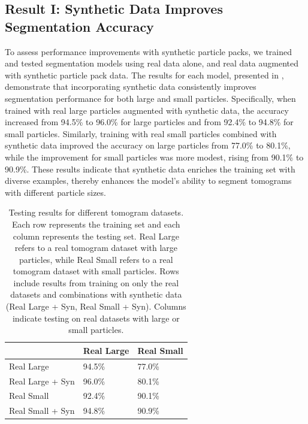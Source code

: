 \documentclass[preprint,12pt]{elsarticle}
\begin{document}
\subsection{Result I: Synthetic Data Improves Segmentation Accuracy}
To assess performance improvements with synthetic particle packs, we trained and tested segmentation models using real data alone, and real data augmented with synthetic particle pack data. 
The results for each model, presented in , demonstrate that incorporating synthetic data consistently improves segmentation performance for both large and small particles.
Specifically, when trained with real large particles augmented with synthetic data, the accuracy increased from 94.5\% to 96.0\% for large particles and from 92.4\% to 94.8\% for small particles. 
Similarly, training with real small particles combined with synthetic data improved the accuracy on large particles from 77.0\% to 80.1\%, while the improvement for small particles was more modest, rising from 90.1\% to 90.9\%. 
These results indicate that synthetic data enriches the training set with diverse examples, thereby enhances the model's ability to segment tomograms with different particle sizes. 
\begin{table}[]
    \center
    \begin{tabular}{|l|l|l|}
        \hline
                                 & Real Large & Real Small \\ \hline
        Real Large               & 94.5\%     & 77.0\%     \\ \hline
        Real Large + Syn         & 96.0\%     & 80.1\%     \\ \hline
        Real Small               & 92.4\%     & 90.1\%     \\ \hline
        Real Small + Syn         & 94.8\%     & 90.9\%     \\ \hline
    \end{tabular}
    \caption{Testing results for different tomogram datasets. 
    Each row represents the training set and each column represents the testing set. 
    Real Large refers to a real tomogram dataset with large particles, while Real Small refers to a real tomogram dataset with small particles. 
    Rows include results from training on only the real datasets and combinations with synthetic data (Real Large + Syn, Real Small + Syn). 
    Columns indicate testing on real datasets with large or small particles.}
    \label{tab:res1}
\end{table}
\end{document}

